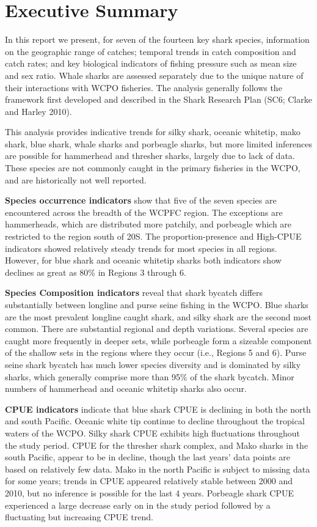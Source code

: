 \documentclass[12pt]{SCreport}
\begin{document}
\wcpfctitlepage

\tableofcontents

\newpage
\section*{Executive Summary}
In this report we present, for seven of the fourteen key shark species, information on the geographic range of catches; temporal trends in catch composition and catch rates; and key biological indicators of fishing pressure such as mean size and sex ratio. Whale sharks are assessed separately due to the unique nature of their interactions with WCPO fisheries. The analysis generally follows the framework first developed and described in the Shark Research Plan (SC6; Clarke and Harley 2010). 

This analysis provides indicative trends for silky shark, oceanic whitetip, mako shark, blue shark, whale sharks and porbeagle sharks, but more limited inferences are  possible for hammerhead and thresher sharks, largely due to lack of data. These species are not commonly caught in the primary fisheries in the WCPO, and are historically not well reported. 

\textbf{Species occurrence indicators} show that five of the seven species are encountered across the breadth of the WCPFC region. The exceptions are hammerheads, which are distributed more patchily, and porbeagle which are restricted to the region south of 20\degree{}S. The proportion-presence and High-CPUE indicators showed relatively steady trends for most species in all regions. However, for blue shark and oceanic whitetip sharks both indicators show declines as great as 80\% in Regions 3 through 6.

\textbf{Species Composition indicators} reveal that shark bycatch differs substantially between longline and purse seine fishing in the WCPO. Blue sharks are the most prevalent longline caught shark, and silky shark are the second most common. There are substantial regional and depth variations.  Several species are caught more frequently in deeper sets, while porbeagle form a sizeable component of the shallow sets in the regions where they occur (i.e., Regions 5 and 6). Purse seine shark bycatch has much lower species diversity and is dominated by silky sharks, which generally comprise more than 95\% of the shark bycatch. Minor numbers of hammerhead and oceanic whitetip sharks also occur.  

\textbf{CPUE indicators} indicate that blue shark CPUE is declining in both the north and south Pacific. Oceanic white tip continue to decline throughout the tropical waters of the WCPO. Silky shark CPUE exhibits high fluctuations throughout the study period.  
CPUE for the thresher shark complex, and Mako sharks in the south Pacific, appear to be in decline, though the last years' data points are based on relatively few data.  
Mako in the north Pacific is subject to missing data for some years; trends in CPUE appeared relatively stable between 2000 and 2010, but no inference is possible for the last 4 years. Porbeagle shark CPUE experienced a large decrease early on in the study period followed by a fluctuating but increasing CPUE trend.
\end{document}
